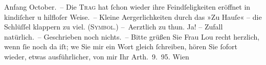 \begin{ledgroupsized}[t]{13cm}
                  Anfang October. – Die \textsc{Trag} hat ſchon wieder ihre Feindſeligkeiten eröffnet in kindiſcher u hilfloſer
               Weise. – Kleine Aergerlichkeiten durch das »Zu Hauſe« – die Schlüſſel {\pb}klappern zu viel. (\textsc{Symbol}.)\pend
           \pstart
           – Aerztlich zu thun. Ja! – Zufall natürlich. –\pend
           \pstart
           Geschrieben noch nichts. –\pend
           \pstart
           Bitte grüßen Sie Frau Lou recht herzlich, wenn
               ſie noch da iſt; we{\geminationn}
               Sie mir ein Wort gleich ſchreiben, {\pb}hören Sie ſofort wieder, etwas ausführlicher, von
               mir\pend
           \pstart Ihr \spacefill\mbox{Arth}\pend{}. 9. 95. Wien\pend
                     \endnumbering{}\end{ledgroupsized}  \newcommand{\dateiname}{L00481}\newcommand{\titel}{Arthur Schnitzler an Richard Beer-Hofmann, 12. 9. 1895}\newcommand{\editorInnen}{Martin Anton Müller und Gerd-Hermann Susen}
            \footnotesize
\begin{ledgroupsized}[t]{11.5cm}
\end{ledgroupsized}
         
      